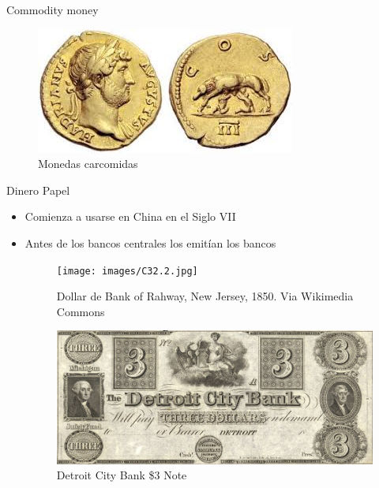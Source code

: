 \documentclass{beamer}
\begin{document}
\begin{frame}{Commodity money }
            \begin{figure} [H]   
  \centering
  \includegraphics[width=.8\textwidth]{Figures/C32.1.jpg}
      \caption{Monedas carcomidas}
  \label{fig:C32.1}
\end{figure}
\end{frame}

\begin{frame}{Dinero Papel}
    \begin{itemize}
        \item Comienza a usarse en China en el Siglo VII
        \item Antes de los bancos centrales los emitían los bancos 
        
\begin{figure} [H]   
  \centering
  \texttt{[image: images/C32.2.jpg]}
      \caption{Dollar de Bank of Rahway, New Jersey, 1850. Via Wikimedia Commons}
  \label{fig:C32.2}
\end{figure}

\begin{figure} [H]   
  \centering
  \includegraphics[width=.35\textwidth]{Figures/C32.3.jpeg}
      \caption{Detroit City Bank \$3 Note}
  \label{fig:C32.3}
\end{figure}
\end{itemize}
\end{frame}
        
\end{document}

